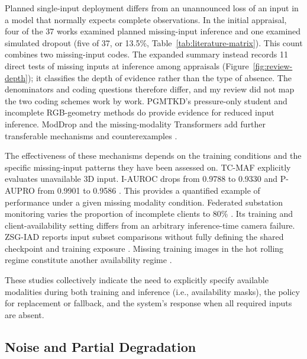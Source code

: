 Planned single-input deployment differs from an unannounced loss of an input in a model that
normally expects complete observations.
In the initial appraisal, four of the 37 works examined planned missing-input inference and one examined simulated dropout (five of 37, or 13.5\%, Table~\ref{tab:literature-matrix}). This count combines two missing-input codes. The expanded summary instead records 11 direct tests of missing inputs at inference among \ReviewWorkCount{} appraisals (Figure~\ref{fig:review-depth}); it classifies the depth of evidence rather than the type of absence. The denominators and coding questions therefore differ, and my review did not map the two coding schemes work by work.
PGMTKD's pressure-only student and incomplete RGB-geometry methods do provide evidence for reduced
input inference. ModDrop and the missing-modality Transformers add further transferable mechanisms
and counterexamples \parencite{Li2025PGMTKD,Sui2026Incomplete,P005,P016}.

The effectiveness of these mechanisms depends on the training conditions and the
specific missing-input patterns they have been assessed on.
TC-MAF explicitly evaluates unavailable 3D input. I-AUROC drops from 0.9788 to 0.9330 and P-AUPRO from
0.9901 to 0.9586 \parencite[Table~3]{P026}.
This provides a quantified example of performance under a given missing modality condition.
Federated substation monitoring varies the proportion of incomplete clients to 80\% \parencite[Figure~8]{P051}.
Its training and client-availability setting differs from an arbitrary inference-time camera
failure.
ZSG-IAD reports input subset comparisons without fully defining the shared checkpoint and training
exposure \parencite{P025}. Missing training images in the hot rolling regime constitute another
availability regime \parencite{Ma2025A}.

These studies collectively indicate the need to explicitly specify available modalities during both
training and inference (i.e., availability masks), the policy for replacement or fallback, and the
system's response when all required inputs are absent.

\subsection{Noise and Partial Degradation}

